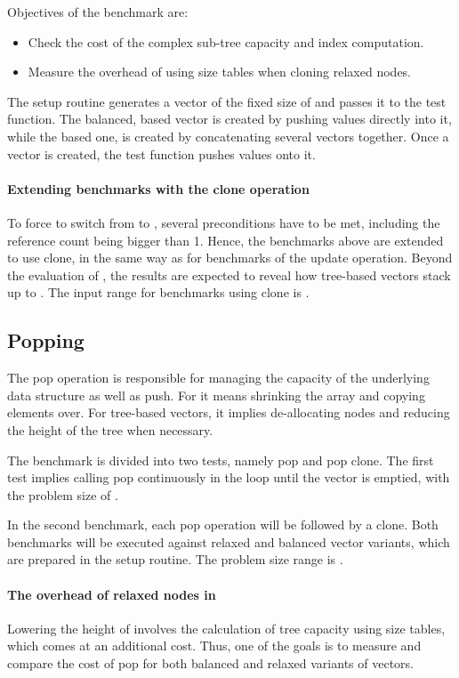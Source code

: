 Objectives of the benchmark are:
\begin{itemize}
    \item Check the cost of the complex sub-tree capacity and index computation.
    \item Measure the overhead of using size tables when cloning relaxed nodes.
\end{itemize}

The setup routine generates a vector of the fixed size of \n{} and passes it to the test function. The balanced, \rbtree{} based vector is created by pushing values directly into it, while the \rrbtree{} based one, is created by concatenating several vectors together. Once a vector is created, the test function pushes \n{} values onto it.

\paragraph{Extending benchmarks with the clone operation}
To force \pvec{} to switch from \stdvec{} to \rrbvec{}, several preconditions have to be met, including the reference count being bigger than 1. Hence, the benchmarks above are extended to use clone, in the same way as for benchmarks of the update operation. Beyond the evaluation of \pvec{}, the results are expected to reveal how tree-based vectors stack up to \stdvec{}. The input range for benchmarks using clone is \range{[10, 20k]}.

\subsection{Popping}
The pop operation is responsible for managing the capacity of the underlying data structure as well as push. For \stdvec{} it means shrinking the array and copying elements over. For tree-based vectors, it implies de-allocating nodes and reducing the height of the tree when necessary.

The benchmark is divided into two tests, namely pop and pop clone. The first test implies calling pop continuously in the loop until the vector is emptied, with the problem size of \range{[20, \kilo{60}]}.

In the second benchmark, each pop operation will be followed by a clone. Both benchmarks will be executed against relaxed and balanced vector variants, which are prepared in the setup routine. The problem size range is \range{[20, \kilo{20}]}.

\paragraph{The overhead of relaxed nodes in \rrbtree{}}
Lowering the height of \rrbtree{} involves the calculation of tree capacity using size tables, which comes at an additional cost. Thus, one of the goals is to measure and compare the cost of pop for both balanced and relaxed variants of vectors.

